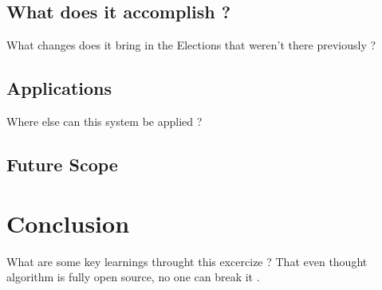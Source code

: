\documentclass[12pt]{report}
\begin{document}
\section{What does it accomplish ?}
What changes does it bring in the Elections that weren't there previously ?
\section{Applications}
Where else can this system be applied ?
\section{Future Scope}


\chapter{Conclusion}
What are some key learnings throught this excercize ? That even thought algorithm is fully open source, no one can break it .

\end{document}
